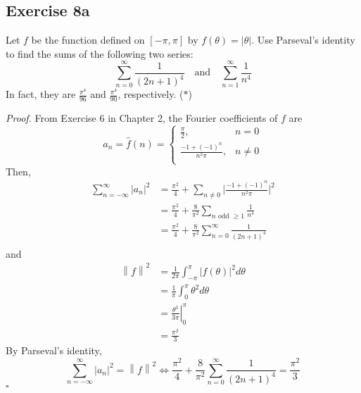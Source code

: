 \documentclass[12pt]{article}
\newenvironment{proof}{\textit{Proof.}}{\hfill$\square$}
\newcommand{\norm}[1]{\left\lVert#1\right\rVert}
\newcommand*\Eval[3]{\left.#1\right\rvert_{#2}^{#3}}
\begin{document}
\newpage
\setcounter{equation}{0}
\subsection*{Exercise 8a}
Let $f$ be the function defined on $[-\pi, \pi]$ by $f(\theta)=|\theta|$. Use Parseval's identity to find the sums of the following two series:
\begin{equation*}
    \sum_{n=0}^{\infty}\frac{1}{(2n+1)^4}\hspace{1em}\text{and}\hspace{1em}\sum_{n=1}^{\infty}\frac{1}{n^4}
\end{equation*}
In fact, they are $\frac{\pi^4}{96}$ and $\frac{\pi^4}{90}$, respectively. ($*$)

\vspace{2em}
\begin{proof}
    From Exercise 6 in Chapter 2, the Fourier coefficients of $f$ are
    \begin{equation*}
        a_n=\hat{f}(n)=\begin{cases}
            \frac{\pi}{2}, &n=0 \\
            \frac{-1+(-1)^n}{n^2\pi}, &n\ne0\\
        \end{cases}
    \end{equation*}
    Then,
    \begin{align*}
        \sum_{n=-\infty}^{\infty}|a_n|^2 &= \frac{\pi^2}{4} + \sum_{n\ne0}\Big|\frac{-1+(-1)^n}{n^2\pi}\Big|^2 \\
        &= \frac{\pi^2}{4} + \frac{8}{\pi^2}\sum_{n\text{ odd }\ge 1}\frac{1}{n^4} \\
        &= \frac{\pi^2}{4} + \frac{8}{\pi^2}\sum_{n=0}^{\infty}\frac{1}{(2n+1)^4} \\
    \end{align*}
    and
    \begin{align*}
        \norm{f}^2 &= \frac{1}{2\pi}\int_{-\pi}^{\pi}|f(\theta)|^2d\theta \\
        &= \frac{1}{\pi}\int_{0}^{\pi}\theta^2d\theta \\
        &= \Eval{\frac{\theta^3}{3\pi}}{0}{\pi} \\
        &= \frac{\pi^2}{3}
    \end{align*}
    By Parseval's identity, 
    \begin{equation}
        \sum_{n=-\infty}^{\infty}|a_n|^2=\norm{f}^2 \iff \frac{\pi^2}{4} + \frac{8}{\pi^2}\sum_{n=0}^{\infty}\frac{1}{(2n+1)^4} = \frac{\pi^2}{3}

\end{equation}
\end{proof}
\end{document}
